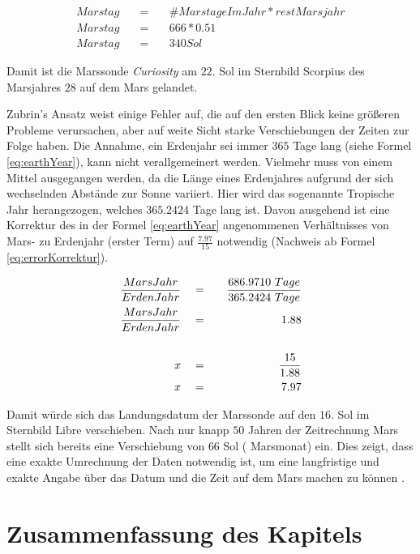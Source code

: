 \begin{eqnarray}
	Marstag \quad & = & \quad \#MarstageImJahr * restMarsjahr \\
	Marstag \quad & = & \quad 666 * 0.51 \\
	Marstag \quad & = & \quad 340 Sol 
	\label{eq:MarsMonthSol}
\end{eqnarray}

Damit ist die Marssonde \textit{Curiosity} am $22.$ Sol im Sternbild Scorpius
des Marsjahres $28$ auf dem Mars gelandet.

Zubrin's Ansatz weist einige Fehler auf, die auf den ersten Blick keine
gr{\"o}{\ss}eren Probleme verursachen, aber auf weite Sicht starke
Verschiebungen der Zeiten zur Folge haben. Die Annahme, ein Erdenjahr sei immer $365$ Tage lang (siehe Formel
\ref{eq:earthYear}), kann nicht verallgemeinert werden. Vielmehr muss von einem
Mittel ausgegangen werden, da die L{\"a}nge eines Erdenjahres aufgrund der sich
wechselnden Abst{\"a}nde zur Sonne variiert. Hier wird das sogenannte Tropische Jahr
herangezogen, welches $365.2424$ Tage lang ist. Davon ausgehend ist eine
Korrektur des in der Formel \ref{eq:earthYear} angenommenen Verh{\"a}ltnisses von
Mars- zu Erdenjahr (erster Term) auf $\frac{7.97}{15}$ notwendig (Nachweis ab
Formel \ref{eq:errorKorrektur}).

\begin{eqnarray}
	\frac{MarsJahr}{ErdenJahr} \quad & = & \quad \frac{686.9710 \ Tage}{365.2424 \
	Tage}
	\\
	\label{eq:errorKorrektur}  
	\frac{MarsJahr}{ErdenJahr} \quad & = & \quad 1.88 \\
	\notag\\
	x \quad & = & \quad \frac{15}{1.88} \\
	x \quad & = & \quad 7.97 
\end{eqnarray}

Damit w{\"u}rde sich das Landungsdatum der Marssonde auf den $16.$ Sol im Sternbild
Libre verschieben. Nach nur knapp $50$ Jahren der Zeitrechnung Mars stellt sich
bereits eine Verschiebung von $66$ Sol (\ca 1 Marsmonat) ein. Dies zeigt, dass
eine exakte Umrechnung der Daten notwendig ist, um eine langfristige und exakte
Angabe {\"u}ber das Datum und die Zeit auf dem Mars machen zu k{\"o}nnen
\cite{web10}.

\section{Zusammenfassung des Kapitels}


